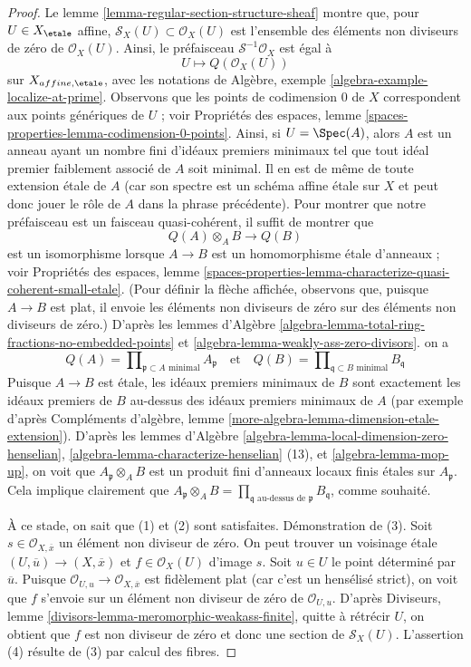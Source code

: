 \begin{proof}
Le lemme \ref{lemma-regular-section-structure-sheaf}
montre que, pour $U \in X_\etale$ affine,
$\mathcal{S}_X(U) \subset \mathcal{O}_X(U)$
est l'ensemble des éléments non diviseurs de zéro de $\mathcal{O}_X(U)$.
Ainsi, le préfaisceau $\mathcal{S}^{-1}\mathcal{O}_X$ est égal à
$$
U \longmapsto Q(\mathcal{O}_X(U))
$$
sur $X_{affine, \etale}$, avec les notations de
Algèbre, exemple \ref{algebra-example-localize-at-prime}.
Observons que les points de codimension $0$ de $X$ correspondent
aux points génériques de $U$ ; voir
Propriétés des espaces, lemme \ref{spaces-properties-lemma-codimension-0-points}.
Ainsi, si $U = \Spec(A)$, alors $A$ est un anneau ayant un nombre fini d'idéaux premiers minimaux
tel que tout idéal premier faiblement associé de $A$ soit minimal.
Il en est de même de toute extension \'etale de $A$ (car son
spectre est un schéma affine \'etale sur $X$ et peut donc
jouer le rôle de $A$ dans la phrase précédente).
Pour montrer que notre préfaisceau est un faisceau quasi-cohérent,
il suffit de montrer que
$$
Q(A) \otimes_A B \longrightarrow Q(B)
$$
est un isomorphisme lorsque $A \to B$ est un homomorphisme \'etale d'anneaux ; voir
Propriétés des espaces, lemme
\ref{spaces-properties-lemma-characterize-quasi-coherent-small-etale}.
(Pour définir la flèche affichée, observons que, puisque $A \to B$
est plat, il envoie les éléments non diviseurs de zéro sur des éléments non diviseurs de zéro.)
D'après les lemmes d'Algèbre
\ref{algebra-lemma-total-ring-fractions-no-embedded-points} et
\ref{algebra-lemma-weakly-ass-zero-divisors}.
on a
$$
Q(A) = \prod\nolimits_{\mathfrak p \subset A\text{ minimal}} A_\mathfrak p
\quad\text{et}\quad
Q(B) = \prod\nolimits_{\mathfrak q \subset B\text{ minimal}} B_\mathfrak q
$$
Puisque $A \to B$ est \'etale, les idéaux premiers minimaux de $B$ sont exactement les
idéaux premiers de $B$ au-dessus des idéaux premiers minimaux
de $A$ (par exemple d'après Compléments d'algèbre, lemme
\ref{more-algebra-lemma-dimension-etale-extension}).
D'après les lemmes d'Algèbre \ref{algebra-lemma-local-dimension-zero-henselian},
\ref{algebra-lemma-characterize-henselian} (13), et
\ref{algebra-lemma-mop-up}, on voit que $A_\mathfrak p \otimes_A B$
est un produit fini d'anneaux locaux finis \'etales sur $A_\mathfrak p$.
Cela implique clairement que $A_\mathfrak p \otimes_A B =
\prod_{\mathfrak q\text{ au-dessus de }\mathfrak p} B_\mathfrak q$,
comme souhaité.

\medskip\noindent
À ce stade, on sait que (1) et (2) sont satisfaites.
Démonstration de (3). Soit $s \in \mathcal{O}_{X, \overline{x}}$
un élément non diviseur de zéro. On peut trouver un voisinage \'etale
$(U, \overline{u}) \to (X, \overline{x})$
et $f \in \mathcal{O}_X(U)$ d'image $s$.
Soit $u \in U$ le point déterminé par $\overline{u}$.
Puisque $\mathcal{O}_{U, u} \to \mathcal{O}_{X, \overline{x}}$
est fidèlement plat (car c'est un hensélisé strict), on voit que
$f$ s'envoie sur un élément non diviseur de zéro de $\mathcal{O}_{U, u}$.
D'après Diviseurs, lemme \ref{divisors-lemma-meromorphic-weakass-finite},
quitte à rétrécir $U$, on obtient que $f$ est non diviseur de zéro
et donc une section de $\mathcal{S}_X(U)$.
L'assertion (4) résulte de (3) par calcul des fibres.
\end{proof}

